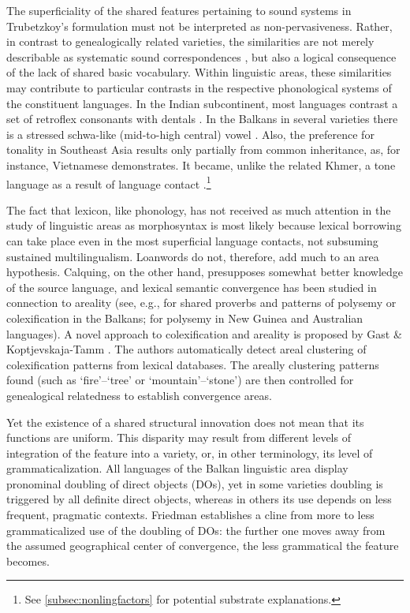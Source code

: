 \documentclass[output=paper,
modfonts
]{langscibook}
\begin{document}
The superficiality of the shared features pertaining to sound systems in Trubetzkoy's formulation must not be interpreted as non-pervasiveness. Rather, in contrast to genealogically related varieties, the similarities are not merely describable as systematic sound correspondences \parencite{trubetzkoy28}, but also a logical consequence of the lack of shared basic vocabulary. Within linguistic areas, these similarities may contribute to particular contrasts in the respective phonological systems of the constituent languages. In the Indian subcontinent, most languages contrast a set of retroflex consonants with dentals \parencite[7]{emeneau56}. In the Balkans in several varieties there is a stressed schwa-like (mid-to-high central) vowel \parencite[28–30]{asenova2002}. Also, the preference for tonality in Southeast Asia results only partially from common inheritance, as, for instance, Vietnamese demonstrates. It became, unlike the related Khmer, a tone language as a result of language contact \parencite[191]{enfield2005}.\footnote{See \ref{subsec:nonlingfactors} for potential substrate explanations.}

The fact that lexicon, like phonology, has not received as much attention in the study of linguistic areas as morphosyntax is most likely because lexical borrowing can take place even in the most superficial language contacts, not subsuming sustained multilingualism. Loanwords do not, therefore, add much to an area hypothesis. Calquing, on the other hand, presupposes somewhat better knowledge of the source language, and lexical semantic convergence has been studied in connection to areality (see, e.g., \citealt[48–61]{asenova2002} for shared proverbs and patterns of polysemy or colexification in the Balkans; \citealt{aikhenvald2009} for polysemy in New Guinea and Australian languages). A novel approach to colexification and areality is proposed by Gast \& Koptjevskaja-Tamm \parencite*{gast2018}. The authors automatically detect areal clustering of colexification patterns from lexical databases. The  areally clustering patterns found (such as `fire'--`tree' or `mountain'--`stone') are then controlled for genealogical relatedness to establish convergence areas. 

Yet the existence of a shared structural innovation does not mean that its functions are uniform. This disparity may result from different levels of integration of the feature into a variety, or, in other terminology, its level of grammaticalization. All languages of the Balkan linguistic area display pronominal doubling of direct objects (DOs), yet in some varieties doubling is triggered by all definite direct objects, whereas in others its use depends on less frequent, pragmatic contexts. Friedman \parencite*{friedman2008} establishes a cline from more to less grammaticalized use of the doubling of DOs: the further one moves away from the assumed geographical center of convergence, the less grammatical the feature becomes.
\end{document}
